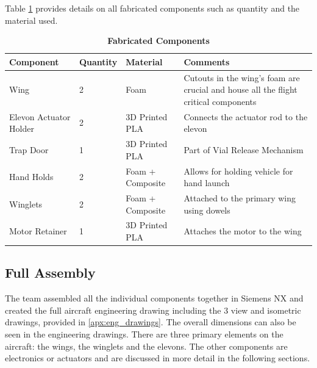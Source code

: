         Table \ref{table:fab_components} provides details on all fabricated components such as quantity and the material used.
        
        
        \begin{table}[H]
            \begin{center}
            \caption{\textbf{Fabricated Components}} \label{table:fab_components}
             \begin{tabular}{|p{1.6in}|p{0.7in}|p{1.3in}|p{1.5in}|} %
                \hline \textbf{Component} & \textbf{Quantity} & \textbf{Material} & \textbf{Comments} \\ \hline %
                Wing & 2 & Foam & Cutouts in the wing's foam are crucial and house all the flight critical components \\ \hline
                Elevon Actuator Holder & 2 & 3D Printed PLA & Connects the actuator rod to the elevon \\ \hline
                Trap Door & 1 & 3D Printed PLA & Part of Vial Release Mechanism \\ \hline
                Hand Holds & 2 & Foam + Composite & Allows for holding vehicle for hand launch \\ \hline
                Winglets & 2 & Foam + Composite & Attached to the primary wing using dowels \\  \hline
                Motor Retainer & 1 & 3D Printed PLA & Attaches the motor to the wing \\ \hline
            \end{tabular}
            \end{center}
        \end{table}
    
    \subsection{Full Assembly}
    
        The team assembled all the individual components together in Siemens NX and created the full aircraft engineering drawing including the 3 view and isometric drawings, provided in \ref{apx:eng_drawings}. The overall dimensions can also be seen in the engineering drawings. There are three primary elements on the aircraft: the wings, the winglets and the elevons. The other components are electronics or actuators and are discussed in more detail in the following sections.
        
